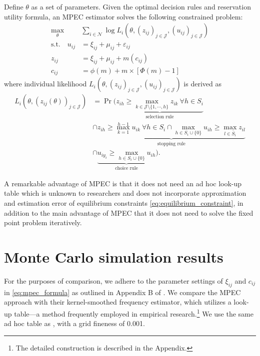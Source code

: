 \documentclass[12pt]{article}
\begin{document}
Define $\theta$ as a set of parameters.
Given the optimal decision rules and reservation utility formula, an MPEC estimator solves the following constrained problem:
\begin{align}
    \max_{\theta}& \sum_{i\in \mathcal{N}} \log L_{i}(\theta,(z_{ij})_{j\in \mathcal{J}},(u_{ij})_{j\in \mathcal{J}})\nonumber\\
    \text{s.t.}\quad u_{i j} & =\xi_{i j}+\mu_{i j}+\varepsilon_{i j}\label{eq:mpec_formula}\\
    z_{i j}&=\xi_{i j}+\mu_{i j}+m\left(c_{i j}\right) \nonumber\\
    c_{i j}&=\phi(m)+m \times[\Phi(m)-1] \nonumber
\end{align}
where individual likelihood $L_{i}(\theta,(z_{ij})_{j\in \mathcal{J}},(u_{ij})_{j\in \mathcal{J}})$ is derived as
\begin{align*}
    L_{i}(\theta,(z_{ij}(\theta))_{j\in \mathcal{J}}) &= \Pr (\underbrace{z_{ih} \geq \max_{k \in \mathcal{J}\setminus \{1,\cdots,h\}} z_{ik} \: \forall h \in S_i}_{\text{selection rule}}\\
    & \cap \underbrace{z_{ih} \geq \max_{k = 1}^{h-1} u_{ik} \: \forall h \in S_i \cap \max_{h \in S_i \cup \{0\}} u_{ih} \geq \max_{l \in \bar{S}_i} z_{il} }_{\text{stopping rule}}\\
    & \cap \underbrace{u_{iy_i} \geq \max_{h \in S_i \cup \{0\}} u_{ih} }_{\text{choice rule}}).
\end{align*}

A remarkable advantage of MPEC is that it does not need an ad hoc look-up table which is unknown to researchers and does not incorporate approximation and estimation error of equilibrium constraints \eqref{eq:equilibrium_constraint}, in addition to the main advantage of MPEC that it does not need to solve the fixed point problem iteratively.

\section{Monte Carlo simulation results}

For the purposes of comparison, we adhere to the parameter settings of \(\xi_{ij}\) and \(c_{ij}\) in \eqref{eq:mpec_formula} as outlined in Appendix B of \cite{ursu2023sequential}. We compare the MPEC approach with their kernel-smoothed frequency estimator, which utilizes a look-up table—a method frequently employed in empirical research.\footnote{The detailed construction is described in the Appendix.} We use the same ad hoc table as \cite{ursu2023sequential}, with a grid fineness of 0.001.
\end{document}
